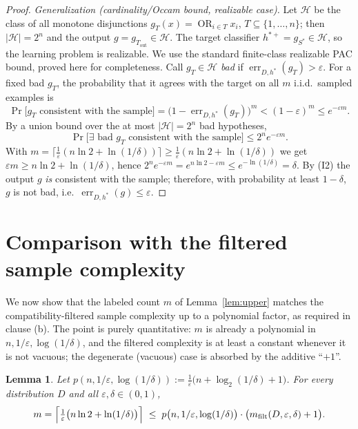 \documentclass{amsart}
\newtheorem{lemma}{Lemma}
\theoremstyle{definition}
\DeclareMathOperator{\err}{err}
\DeclareMathOperator*{\OR}{OR}
\newcommand{\eps}{\varepsilon}
\begin{document}
\begin{proof}
\emph{Generalization (cardinality/Occam bound, realizable case).}
Let $\mathcal H$ be the class of all monotone disjunctions
$g_T(x)=\OR_{i\in T}x_i$, $T\subseteq\{1,\dots,n\}$; then
$|\mathcal H|=2^n$ and the output $g=g_{T_{\mathrm{out}}}\in\mathcal H$. The
target classifier $h^{\ast+}=g_{S^\ast}\in\mathcal H$, so the learning problem
is realizable. We use the standard finite-class realizable PAC bound, proved
here for completeness. Call $g_T\in\mathcal H$ \emph{bad} if
$\err_{D,h^\ast}(g_T)>\eps$. For a fixed bad $g_T$, the probability that it
agrees with the target on all $m$ i.i.d.\ sampled examples is
\[
  \Pr\bigl[g_T\text{ consistent with the sample}\bigr]
   =\bigl(1-\err_{D,h^\ast}(g_T)\bigr)^m
   <(1-\eps)^m\le e^{-\eps m}.
\]
By a union bound over the at most $|\mathcal H|=2^n$ bad hypotheses,
\[
  \Pr\bigl[\exists\text{ bad } g_T\text{ consistent with the sample}\bigr]
   \le 2^n e^{-\eps m}.
\]
With $m=\lceil\frac1\eps(n\ln2+\ln(1/\delta))\rceil\ge
\frac1\eps(n\ln2+\ln(1/\delta))$ we get
$\eps m\ge n\ln2+\ln(1/\delta)$, hence
$2^n e^{-\eps m}=e^{n\ln2-\eps m}\le e^{-\ln(1/\delta)}=\delta$. By (I2) the
output $g$ \emph{is} consistent with the sample; therefore, with probability at
least $1-\delta$, $g$ is not bad, i.e.\ $\err_{D,h^\ast}(g)\le\eps$.
\end{proof}

\section{Comparison with the filtered sample complexity}\label{sec:lower}

We now show that the labeled count $m$ of Lemma~\ref{lem:upper} matches the
compatibility-filtered sample complexity up to a polynomial factor, as required
in clause (b). The point is purely quantitative: $m$ is already a polynomial in
$n,1/\eps,\log(1/\delta)$, and the filtered complexity is at least a constant
whenever it is not vacuous; the degenerate (vacuous) case is absorbed by the
additive ``$+1$''.

\begin{lemma}\label{lem:compare}
Let $p(n,1/\eps,\log(1/\delta)):=\frac1\eps\bigl(n+\log_2(1/\delta)+1\bigr)$.
For every distribution $D$ and all $\eps,\delta\in(0,1)$,
\[
  m=\Bigl\lceil \tfrac1\eps\bigl(n\ln2+\ln(1/\delta)\bigr)\Bigr\rceil
  \;\le\; p\bigl(n,1/\eps,\log(1/\delta)\bigr)\cdot
          \bigl(m_{\mathrm{filt}}(D,\eps,\delta)+1\bigr).
\]
\end{lemma}
\end{document}
